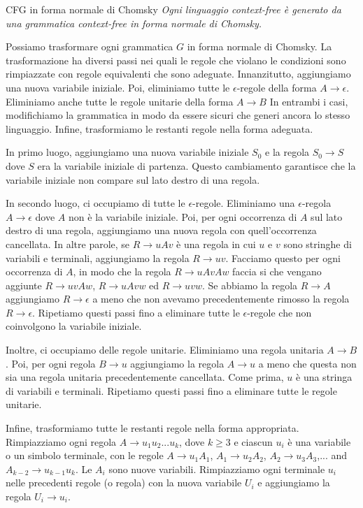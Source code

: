 \begin{Thm}{CFG in forma normale di Chomsky}{}\label{thm:cfg-chomsky}
\textit{Ogni linguaggio context-free è generato da una grammatica context-free in forma normale di Chomsky.}
\begin{osservation}
Possiamo trasformare ogni grammatica $G$ in forma normale di Chomsky. La trasformazione ha diversi passi nei quali le regole che violano le condizioni sono rimpiazzate con regole equivalenti che sono adeguate. Innanzitutto, aggiungiamo una nuova variabile iniziale. Poi, eliminiamo tutte le $\epsilon$-regole della forma $A\to\epsilon$. Eliminiamo anche tutte le regole unitarie della forma $A\to B$ In entrambi i casi, modifichiamo la grammatica in modo da essere sicuri che generi ancora lo stesso linguaggio. Infine, trasformiamo le restanti regole nella forma adeguata.
\end{osservation}
\begin{demonstration}
In primo luogo, aggiungiamo una nuova variabile iniziale $S_{0}$ e la regola $S_{0}\to S$ dove $S$ era la variabile iniziale di partenza. Questo cambiamento garantisce che la variabile iniziale non compare sul lato destro di una regola.

In secondo luogo, ci occupiamo di tutte le $\epsilon$-regole. Eliminiamo una $\epsilon$-regola $A\to\epsilon$ dove $A$ non è la variabile iniziale. Poi, per ogni occorrenza di $A$ sul lato destro di una regola, aggiungiamo una nuova regola con quell'occorrenza cancellata. In altre parole, se $R\to uAv$ è una regola in cui $u$ e $v$ sono stringhe di variabili e terminali, aggiungiamo la regola $R\to uv$. Facciamo questo per ogni occorrenza di $A$, in modo che la regola $R\to uAvAw$ faccia si che vengano aggiunte $R\to uvAw$, $R\to uAvw$ ed $R\to uvw$. Se abbiamo la regola $R\to A$ aggiungiamo $R\to\epsilon$ a meno che non avevamo precedentemente rimosso la regola $R\to\epsilon$. Ripetiamo questi passi fino a eliminare tutte le $\epsilon$-regole che non coinvolgono la variabile iniziale.

Inoltre, ci occupiamo delle regole unitarie. Eliminiamo una regola unitaria $A\to B$. Poi, per ogni regola $B\to u$ aggiungiamo la regola $A\to u$ a meno che questa non sia una regola unitaria precedentemente cancellata. Come prima, $u$ è una stringa di variabili e terminali. Ripetiamo questi passi fino a eliminare tutte le regole unitarie.

Infine, trasformiamo tutte le restanti regole nella forma appropriata. Rimpiazziamo ogni regola $A\to u_{1}u_{2}...u_k$, dove $k\geq 3$ e ciascun $u_{i}$ è una variabile o un simbolo terminale, con le regole $A\to u_{1}A_{1}$, $A_{1} \rightarrow u_{2}A_{2}$, $A_{2}\to u_{3}A_{3}$,... and $A_{k-2}\to u_{k-1}u_k$. Le $A_{i}$ sono nuove variabili. Rimpiazziamo ogni terminale $u_{i}$ nelle precedenti regole (o regola) con la nuova variabile $U_{i}$ e aggiungiamo la regola $U_{i}\to u_{i}$.
\end{demonstration}
\end{Thm}

